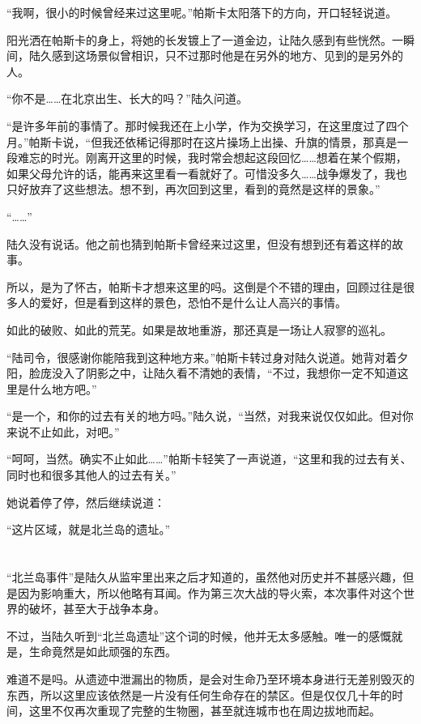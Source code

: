 “我啊，很小的时候曾经来过这里呢。”帕斯卡太阳落下的方向，开口轻轻说道。

阳光洒在帕斯卡的身上，将她的长发镀上了一道金边，让陆久感到有些恍然。一瞬间，陆久感到这场景似曾相识，只不过那时他是在另外的地方、见到的是另外的人。

“你不是……在北京出生、长大的吗？”陆久问道。

“是许多年前的事情了。那时候我还在上小学，作为交换学习，在这里度过了四个月。”帕斯卡说，“但我还依稀记得那时在这片操场上出操、升旗的情景，那真是一段难忘的时光。刚离开这里的时候，我时常会想起这段回忆……想着在某个假期，如果父母允许的话，能再来这里看一看就好了。可惜没多久……战争爆发了，我也只好放弃了这些想法。想不到，再次回到这里，看到的竟然是这样的景象。”

“……”

陆久没有说话。他之前也猜到帕斯卡曾经来过这里，但没有想到还有着这样的故事。

所以，是为了怀古，帕斯卡才想来这里的吗。这倒是个不错的理由，回顾过往是很多人的爱好，但是看到这样的景色，恐怕不是什么让人高兴的事情。

如此的破败、如此的荒芜。如果是故地重游，那还真是一场让人寂寥的巡礼。

“陆司令，很感谢你能陪我到这种地方来。”帕斯卡转过身对陆久说道。她背对着夕阳，脸庞没入了阴影之中，让陆久看不清她的表情，“不过，我想你一定不知道这里是什么地方吧。”

“是一个，和你的过去有关的地方吗。”陆久说，“当然，对我来说仅仅如此。但对你来说不止如此，对吧。”

“呵呵，当然。确实不止如此……”帕斯卡轻笑了一声说道，“这里和我的过去有关、同时也和很多其他人的过去有关。”

她说着停了停，然后继续说道：

“这片区域，就是北兰岛的遗址。”

\section*{}

“北兰岛事件”是陆久从监牢里出来之后才知道的，虽然他对历史并不甚感兴趣，但是因为影响重大，所以他略有耳闻。作为第三次大战的导火索，本次事件对这个世界的破坏，甚至大于战争本身。

不过，当陆久听到“北兰岛遗址”这个词的时候，他并无太多感触。唯一的感慨就是，生命竟然是如此顽强的东西。

难道不是吗。从遗迹中泄漏出的物质，是会对生命乃至环境本身进行无差别毁灭的东西，所以这里应该依然是一片没有任何生命存在的禁区。但是仅仅几十年的时间，这里不仅再次重现了完整的生物圈，甚至就连城市也在周边拔地而起。

